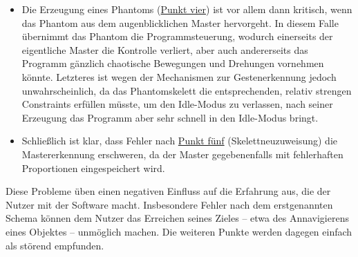 \begin{itemize}
	\item Die Erzeugung eines Phantoms (\hyperref[itm:problem4]{Punkt vier}) ist vor allem dann kritisch, wenn das Phantom aus dem augenblicklichen Master hervorgeht. In diesem Falle übernimmt das Phantom die Programmsteuerung, wodurch einerseits der eigentliche Master die Kontrolle verliert, aber auch andererseits das Programm gänzlich chaotische Bewegungen und Drehungen vornehmen könnte. Letzteres ist wegen der Mechanismen zur Gestenerkennung jedoch unwahrscheinlich, da das Phantomskelett die entsprechenden, relativ strengen Constraints  erfüllen müsste, um den Idle-Modus zu verlassen, nach seiner Erzeugung das Programm aber  sehr schnell in den Idle-Modus bringt.\par 
	\item Schließlich ist klar, dass Fehler nach \hyperref[itm:problem5]{Punkt fünf} (Skelettneuzuweisung) die Mastererkennung erschweren, da der Master gegebenenfalls mit fehlerhaften Proportionen eingespeichert wird.
	\end{itemize}
\par\bigskip
	Diese Probleme üben einen negativen Einfluss auf die Erfahrung aus, die der Nutzer mit der Software macht. Insbesondere Fehler nach dem erstgenannten Schema können dem Nutzer das Erreichen seines Zieles -- etwa des Annavigierens eines Objektes -- unmöglich machen. Die weiteren Punkte werden dagegen einfach als störend empfunden.
